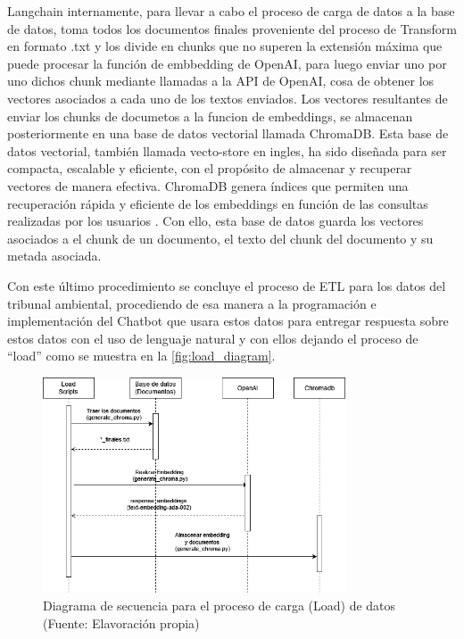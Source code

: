 \par Langchain internamente, para llevar a cabo el proceso de carga de datos a la base de datos, toma todos los documentos finales proveniente del proceso de Transform en formato .txt y los divide en chunks que no superen la extensión máxima que puede procesar la función de embbedding de OpenAI, para luego enviar uno por uno dichos chunk mediante llamadas a la API de OpenAI, cosa de obtener los vectores asociados a cada uno de los textos enviados. 
Los vectores resultantes de enviar los chunks de documetos a la funcion de embeddings, se almacenan posteriormente en una base de datos vectorial llamada ChromaDB. Esta base de 
datos vectorial, también llamada vecto-store en ingles, ha sido diseñada para ser compacta, escalable y eficiente, con el propósito de almacenar y recuperar vectores de manera 
efectiva. ChromaDB genera índices que permiten una recuperación rápida y eficiente de los embeddings en función de las 
consultas realizadas por los usuarios \cite{langchain1}. Con ello, esta base de datos guarda los vectores asociados a el chunk de un documento, 
el texto del chunk del documento y su metada asociada.

\newpage

\par Con este último procedimiento se concluye el proceso de ETL para los datos del tribunal ambiental, procediendo de esa manera 
a la programación e implementación del Chatbot que usara estos datos para entregar respuesta sobre estos datos con el uso de 
lenguaje natural y con ellos dejando el proceso de ``load'' como se muestra en la \autoref{fig:load_diagram}.\\


\begin{figure}[ht!]
    \centering
    \includegraphics[width=0.8\textwidth]{figures/load_diagram.png}
    \caption[Diagrama de secuencia para el proceso de carga (Load) de datos]{Diagrama de secuencia para el proceso de carga (Load)  de datos\\
    {\scriptsize (Fuente: Elavoración propia)}}
    \label{fig:load_diagram}
\end{figure}

